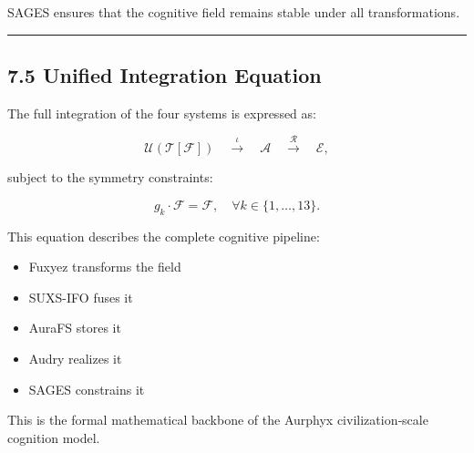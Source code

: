 SAGES ensures that the cognitive field remains stable under all transformations.

\begin{center}\rule{0.5\linewidth}{0.5pt}\end{center}

\subsection{7.5 Unified Integration Equation}\label{unified-integration-equation}

The full integration of the four systems is expressed as:

\[
\mathcal{U} \left( \mathcal{T}[\mathcal{F}] \right)
\quad \xrightarrow{\iota}
\quad \mathcal{A}
\quad \xrightarrow{\mathcal{R}}
\quad \mathcal{E},
\]

subject to the symmetry constraints:

\[
g_k \cdot \mathcal{F} = \mathcal{F}, \quad \forall k \in \{1,\dots,13\}.
\]

This equation describes the complete cognitive pipeline:

\begin{itemize}
\tightlist
\item
  Fuxyez transforms the field\\
\item
  SUXS-IFO fuses it\\
\item
  AuraFS stores it\\
\item
  Audry realizes it\\
\item
  SAGES constrains it
\end{itemize}

This is the formal mathematical backbone of the Aurphyx civilization‑scale cognition model.
